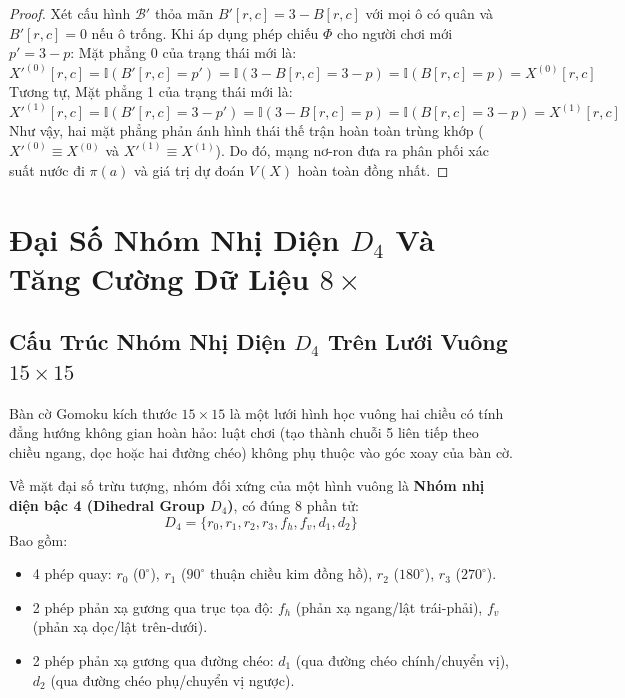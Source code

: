 \documentclass[11pt,a4paper]{report}
\begin{document}
\begin{proof}
Xét cấu hình $\mathcal{B}'$ thỏa mãn $B'[r, c] = 3 - B[r, c]$ với mọi ô có quân và $B'[r, c] = 0$ nếu ô trống. Khi áp dụng phép chiếu $\Phi$ cho người chơi mới $p' = 3 - p$:
Mặt phẳng 0 của trạng thái mới là:
\begin{equation}
    X'^{(0)}[r, c] = \mathbb{I}(B'[r, c] = p') = \mathbb{I}(3 - B[r, c] = 3 - p) = \mathbb{I}(B[r, c] = p) = X^{(0)}[r, c]
\end{equation}
Tương tự, Mặt phẳng 1 của trạng thái mới là:
\begin{equation}
    X'^{(1)}[r, c] = \mathbb{I}(B'[r, c] = 3 - p') = \mathbb{I}(3 - B[r, c] = p) = \mathbb{I}(B[r, c] = 3 - p) = X^{(1)}[r, c]
\end{equation}
Như vậy, hai mặt phẳng phản ánh hình thái thế trận hoàn toàn trùng khớp ($X'^{(0)} \equiv X^{(0)}$ và $X'^{(1)} \equiv X^{(1)}$). Do đó, mạng nơ-ron đưa ra phân phối xác suất nước đi $\pi(a)$ và giá trị dự đoán $V(X)$ hoàn toàn đồng nhất.
\end{proof}

\chapter{Đại Số Nhóm Nhị Diện $D_4$ Và Tăng Cường Dữ Liệu $8\times$}

\section{Cấu Trúc Nhóm Nhị Diện $D_4$ Trên Lưới Vuông $15 \times 15$}

Bàn cờ Gomoku kích thước $15 \times 15$ là một lưới hình học vuông hai chiều có tính đẳng hướng không gian hoàn hảo: luật chơi (tạo thành chuỗi 5 liên tiếp theo chiều ngang, dọc hoặc hai đường chéo) không phụ thuộc vào góc xoay của bàn cờ. 

Về mặt đại số trừu tượng, nhóm đối xứng của một hình vuông là \textbf{Nhóm nhị diện bậc 4 (Dihedral Group $D_4$)}, có đúng 8 phần tử:
\begin{equation}
    D_4 = \{ r_0, r_1, r_2, r_3, f_h, f_v, d_1, d_2 \}
\end{equation}
Bao gồm:
\begin{itemize}
    \item 4 phép quay: $r_0$ ($0^\circ$), $r_1$ ($90^\circ$ thuận chiều kim đồng hồ), $r_2$ ($180^\circ$), $r_3$ ($270^\circ$).
    \item 2 phép phản xạ gương qua trục tọa độ: $f_h$ (phản xạ ngang/lật trái-phải), $f_v$ (phản xạ dọc/lật trên-dưới).
    \item 2 phép phản xạ gương qua đường chéo: $d_1$ (qua đường chéo chính/chuyển vị), $d_2$ (qua đường chéo phụ/chuyển vị ngược).
\end{itemize}
\end{document}
